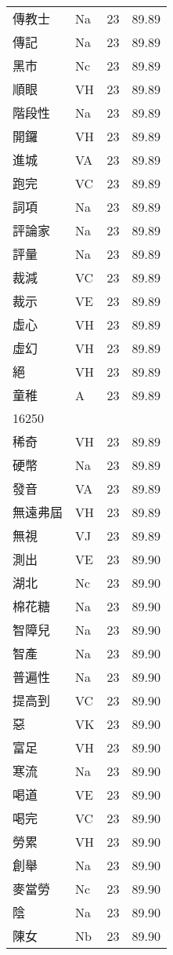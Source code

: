 \documentclass[twocolumn]{book}
\begin{document}
\begin{supertabular}{llrr}
傳教士 & Na & 23 &  89.89\\
傳記 & Na & 23 &  89.89\\
黑市 & Nc & 23 &  89.89\\
順眼 & VH & 23 &  89.89\\
階段性 & Na & 23 &  89.89\\
開鑼 & VH & 23 &  89.89\\
進城 & VA & 23 &  89.89\\
跑完 & VC & 23 &  89.89\\
詞項 & Na & 23 &  89.89\\
評論家 & Na & 23 &  89.89\\
評量 & Na & 23 &  89.89\\
裁減 & VC & 23 &  89.89\\
裁示 & VE & 23 &  89.89\\
虛心 & VH & 23 &  89.89\\
虛幻 & VH & 23 &  89.89\\
絕 & VH & 23 &  89.89\\
童稚 & A & 23 &  89.89\\
16250\\
稀奇 & VH & 23 &  89.89\\
硬幣 & Na & 23 &  89.89\\
發音 & VA & 23 &  89.89\\
無遠弗屆 & VH & 23 &  89.89\\
無視 & VJ & 23 &  89.89\\
測出 & VE & 23 &  89.90\\
湖北 & Nc & 23 &  89.90\\
棉花糖 & Na & 23 &  89.90\\
智障兒 & Na & 23 &  89.90\\
智產 & Na & 23 &  89.90\\
普遍性 & Na & 23 &  89.90\\
提高到 & VC & 23 &  89.90\\
惡 & VK & 23 &  89.90\\
富足 & VH & 23 &  89.90\\
寒流 & Na & 23 &  89.90\\
喝道 & VE & 23 &  89.90\\
喝完 & VC & 23 &  89.90\\
勞累 & VH & 23 &  89.90\\
創舉 & Na & 23 &  89.90\\
麥當勞 & Nc & 23 &  89.90\\
陰 & Na & 23 &  89.90\\
陳女 & Nb & 23 &  89.90\\

\end{supertabular}
\end{document}
